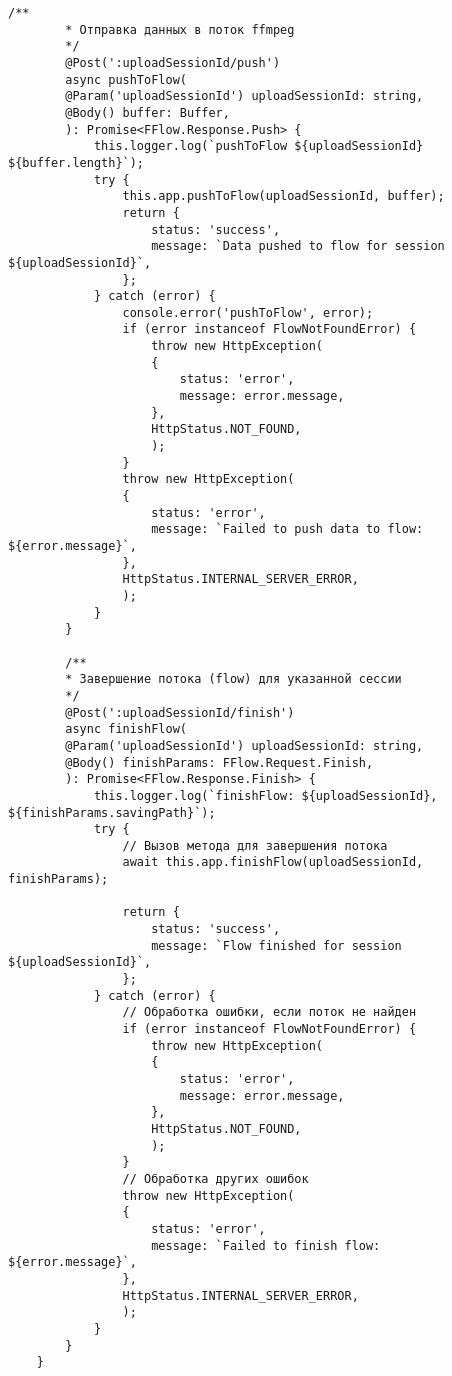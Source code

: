 \begin{lstlisting}[caption={app.controller.ts}]
		/**
		* Отправка данных в поток ffmpeg
		*/
		@Post(':uploadSessionId/push')
		async pushToFlow(
		@Param('uploadSessionId') uploadSessionId: string,
		@Body() buffer: Buffer,
		): Promise<FFlow.Response.Push> {
			this.logger.log(`pushToFlow ${uploadSessionId} ${buffer.length}`);
			try {
				this.app.pushToFlow(uploadSessionId, buffer);
				return {
					status: 'success',
					message: `Data pushed to flow for session ${uploadSessionId}`,
				};
			} catch (error) {
				console.error('pushToFlow', error);
				if (error instanceof FlowNotFoundError) {
					throw new HttpException(
					{
						status: 'error',
						message: error.message,
					},
					HttpStatus.NOT_FOUND,
					);
				}
				throw new HttpException(
				{
					status: 'error',
					message: `Failed to push data to flow: ${error.message}`,
				},
				HttpStatus.INTERNAL_SERVER_ERROR,
				);
			}
		}
		
		/**
		* Завершение потока (flow) для указанной сессии
		*/
		@Post(':uploadSessionId/finish')
		async finishFlow(
		@Param('uploadSessionId') uploadSessionId: string,
		@Body() finishParams: FFlow.Request.Finish,
		): Promise<FFlow.Response.Finish> {
			this.logger.log(`finishFlow: ${uploadSessionId}, ${finishParams.savingPath}`);
			try {
				// Вызов метода для завершения потока
				await this.app.finishFlow(uploadSessionId, finishParams);
				
				return {
					status: 'success',
					message: `Flow finished for session ${uploadSessionId}`,
				};
			} catch (error) {
				// Обработка ошибки, если поток не найден
				if (error instanceof FlowNotFoundError) {
					throw new HttpException(
					{
						status: 'error',
						message: error.message,
					},
					HttpStatus.NOT_FOUND,
					);
				}
				// Обработка других ошибок
				throw new HttpException(
				{
					status: 'error',
					message: `Failed to finish flow: ${error.message}`,
				},
				HttpStatus.INTERNAL_SERVER_ERROR,
				);
			}
		}
	}
\end{lstlisting}

